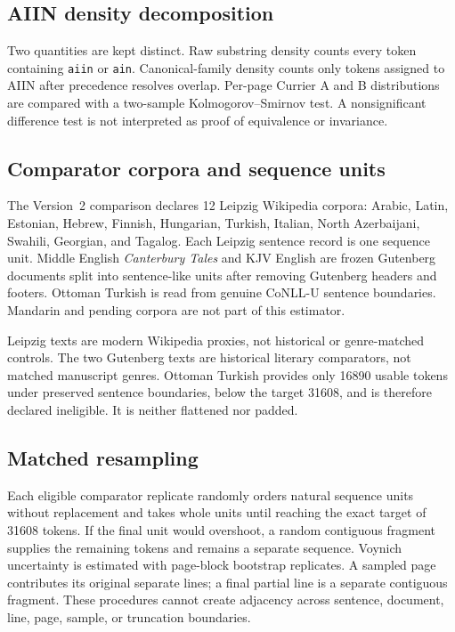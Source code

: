\documentclass[11pt]{article}
\newcommand{\num}[1]{#1}
\begin{document}
\subsection{AIIN density decomposition}

Two quantities are kept distinct. Raw substring density counts every token
containing \texttt{aiin} or \texttt{ain}. Canonical-family density counts only
tokens assigned to AIIN after precedence resolves overlap. Per-page Currier A
and B distributions are compared with a two-sample Kolmogorov--Smirnov test.
A nonsignificant difference test is not interpreted as proof of equivalence or
invariance.

\subsection{Comparator corpora and sequence units}

The Version~2 comparison declares 12 Leipzig Wikipedia corpora: Arabic,
Latin, Estonian, Hebrew, Finnish, Hungarian, Turkish, Italian, North
Azerbaijani, Swahili, Georgian, and Tagalog. Each Leipzig sentence record is
one sequence unit. Middle English \emph{Canterbury Tales} and KJV English are
frozen Gutenberg documents split into sentence-like units after removing
Gutenberg headers and footers. Ottoman Turkish is read from genuine CoNLL-U
sentence boundaries. Mandarin and pending corpora are not part of this
estimator.

Leipzig texts are modern Wikipedia proxies, not historical or genre-matched
controls. The two Gutenberg texts are historical literary comparators, not
matched manuscript genres. Ottoman Turkish provides only \num{16890} usable
tokens under preserved sentence boundaries, below the target \num{31608}, and
is therefore declared ineligible. It is neither flattened nor padded.

\subsection{Matched resampling}

Each eligible comparator replicate randomly orders natural sequence units
without replacement and takes whole units until reaching the exact target of
\num{31608} tokens. If the final unit would overshoot, a random contiguous
fragment supplies the remaining tokens and remains a separate sequence.
Voynich uncertainty is estimated with page-block bootstrap replicates. A
sampled page contributes its original separate lines; a final partial line is
a separate contiguous fragment. These procedures cannot create adjacency
across sentence, document, line, page, sample, or truncation boundaries.
\end{document}
